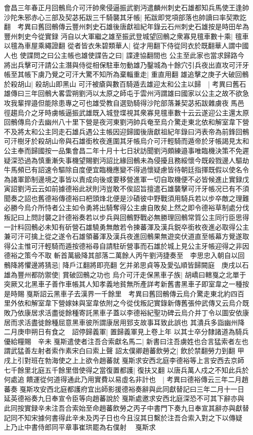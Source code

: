 會昌三年春正月回鶻烏介可汗帥衆侵逼振武劉沔遣麟州刺史石雄都知兵馬使王逢帥沙陀朱邪赤心三部及契苾拓跋三千騎襲其牙帳|{
	拓跋即党項部落也帥讀曰率契欺訖翻　考異曰舊回鶻傳云豐州刺史石雄後唐獻祖紀年錄云石州刺史石雄按是時田牟為豐州刺史今從實録}
沔自以大軍繼之雄至振武登城望回鶻之衆寡見氊車數十乘|{
	氊車以氊為車屋乘繩證翻}
從者皆衣朱碧類華人|{
	從才用翻下侍從同衣於既翻華人謂中國人也}
使諜問之曰公主帳也雄使諜告之曰|{
	諜達協翻間也}
公主至此家也當求歸路今將出兵擊可汗請公主潛與侍從相保駐車勿動雄乃鑿城為十餘穴引兵夜出直攻可汗牙帳至其帳下虜乃覺之可汗大驚不知所為棄輜重走|{
	重直用翻}
雄追擊之庚子大破回鶻於殺胡山|{
	殺胡山即黑山}
可汗被瘡與數百騎遁去雄迎太和公主以歸　|{
	考異曰舊石雄傳曰三年回鶻大畧雲朔劉沔以太原之師屯于雲州沔謂雄曰國家以公主之故不欲急攻我輩捍邉但能除患專之可也雄受教自選勁騎得沙陀部落兼契苾拓跋雜虜夜馬邑徑趨烏介之牙時虜帳逼振武雄既入城登堞視其衆寡見氊車數十云云遂迎公主還太原回鶻傳烏介去幽州八十里下營是夜河東劉沔帥兵奄至烏介驚走東北依和解室韋下營不及將太和公主同走石雄兵遇公主帳因迎歸國後唐獻祖紀年錄曰沔表帝為前鋒回鶻可汗樹牙於殺胡山帝與石雄銜枚夜進圍其牙帳烏介可汗輕騎而遁帝於牙帳謁見太和公主奉而歸國按一品集會昌二年十月十七日狀訪聞劉沔頗練邉事唯臨機決策不免遲疑深恐過為慎重漸失事機望賜劉沔詔比緣回鶻未為侵擾且務綏懷今既殺戮邊人驅劫牛馬頻已有詔速令驅除自度便宜臨機應變不得過懷疑慮皆待朝廷指揮既假以使名令為諸軍節制邊境之事皆以責成向後或要移營進軍一切自取機便不必皆候進止實録戊寅詔劉沔云云如前據德裕此狀則沔豈敢不俟詔旨擅遣石雄襲擊可汗牙帳况已有不須聞奏之詔也舊德裕傳德裕曰杷頭烽北便是沙磧彼中野戰須用騎兵若以步卒敵之理難必勝今烏介所恃者公主如令勇將出騎奪得公主虜自敗矣上然之即令德裕草制處分伐叛記曰上問討襲之計德裕奏若以步兵與回鶻野戰必無勝理回鶻常質公主同行臣思得一計料回鶻必未知有斫營石雄驍勇無敵若令揀蕃渾及漢兵鋭卒銜枚夜進必取得公主兼可汗可擒上從之遂令石雄領蕃渾及漢兵夜進回鶻果無遊奕伏道直至帳幕方覺遂取得公主惟可汗輕騎而遁按德裕尋自請駐斫營事而石雄於城上見公主牙帳迎得之非因德裕之策今不取}
斬首萬級降其部落二萬餘人丙午劉沔捷奏至　李思忠入朝自以回鶻降將懼邊將猜忌|{
	降戶江翻將即亮翻}
乞并弟思貞等及愛弘順皆歸闕庭　庚戌以石雄為豐州都防禦使|{
	賞破回鶻之功也}
烏介可汗走保黑車子族|{
	胡嶠曰轄戛之北單于突厥又北黑車子善作車帳其人知孝義地貧無所產詳考新舊書黑車子即室韋之一種按是時賜戛斯詔云黑車子去漢界一千餘里　考異曰舊回鶻傳云烏介驚走東北約四百里外依和解室韋下營嫁妹與室韋依附之今從伐叛記實錄新傳舊張仲武傳又云烏介既敗乃依康居求活盡徙餘種寄託黑車子蓋以李德裕紀聖功碑云烏介并丁令以圖安依康居而求活盡徙餘種屈意黑車彼所謂康居用郅支故事耳致此誤也}
其潰兵多詣幽州降　二月庚申朔日有食之　詔停歸義軍|{
	置歸義軍見上卷上年}
以其士卒分隸諸道為騎兵優給糧賜　辛未戛斯遣使者注吾合索獻名馬二|{
	新書曰注吾虜姓也合言猛索者左也謂武猛善左射者索作素宋白曰索上聲}
詔太僕卿趙蕃飲勞之|{
	飲於禁翻勞力到翻}
甲戌上引對班在勃海使之上上欲令趙蕃就戛斯求安西北庭李德裕等上言安西去京師七千餘里北庭五千餘里借使得之當復置都護|{
	復扶又翻}
以唐兵萬人戍之不知此兵於何處追饋運從何道得通此乃用實費以易虛名非計也　|{
	考異曰德裕傳云三年二月趙蕃奏戛斯攻安西北庭都護府宜出師影援德裕奏辭與此同獻替記曰三年二月十一日延英德裕奏九日奉宣令臣等向趙蕃說於戛斯處邀求安西北庭深恐不可其下辭亦與此同按實録辛未注吾合索始至命趙蕃飲勞之丙子中書門下奏九日奉宣其辭亦與獻替記同不知宋據何書得此辛未及丙子日也今且沒其日繫於注吾合索入對之下以傳疑}
上乃止中書侍郎同平章事崔珙罷為右僕射　戛斯求

